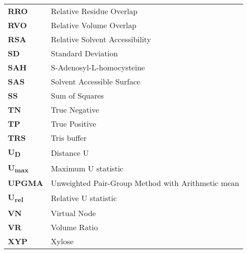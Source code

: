 \begin{longtable}[l]{@{}p{2.5cm}p{12cm}@{}}
\textbf{RRO} & Relative Residue Overlap \\
\textbf{RVO} & Relative Volume Overlap \\
\textbf{RSA} & Relative Solvent Accessibility \\
\textbf{SD} & Standard Deviation \\
\textbf{SAH} & S-Adenosyl-L-homocysteine \\
\textbf{SAS} & Solvent Accessible Surface \\
\textbf{SS} & Sum of Squares \\
\textbf{TN} & True Negative \\
\textbf{TP} & True Positive \\
\textbf{TRS} & Tris buffer \\
\textbf{U\textsubscript{D}} & Distance U \\
\textbf{U\textsubscript{max}} & Maximum U statistic \\
\textbf{UPGMA} & Unweighted Pair-Group Method with Arithmetic mean \\
\textbf{U\textsubscript{rel}} & Relative U statistic \\
\textbf{VN} & Virtual Node \\
\textbf{VR} & Volume Ratio \\
\textbf{XYP} & Xylose \\

\end{longtable}
